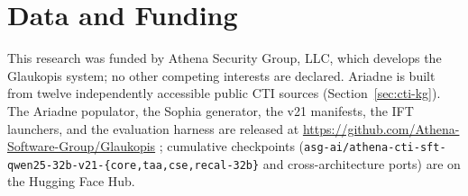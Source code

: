 \documentclass[conference]{IEEEtran}
\providecommand{\hfid}[1]{{\small\nolinkurl{#1}}}
\begin{document}
\section*{Data and Funding}
This research was funded by Athena Security Group, LLC, which develops the Glaukopis system; no other competing interests are declared. Ariadne is built from twelve independently accessible public CTI sources (Section~\ref{sec:cti-kg}). The Ariadne populator, the Sophia generator, the v21 manifests, the IFT launchers, and the evaluation harness are released at \url{https://github.com/Athena-Software-Group/Glaukopis} \cite{glaukopis2026repo}; cumulative checkpoints (\hfid{asg-ai/athena-cti-sft-qwen25-32b-v21-\{core,taa,cse,recal-32b\}} and cross-architecture ports) are on the Hugging Face Hub.



\end{document}
